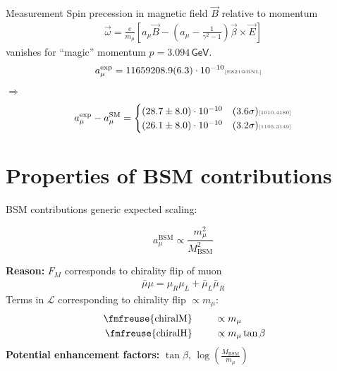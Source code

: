 \documentclass[hyperref={pdfpagelabels=false},ngerman]{beamer}
\newcommand{\fmfvcenter}[1]{\;\vcenter{\hbox{\fmfreuse{#1}}}\;}
\newcommand{\eh}[1]{\,\mathsf{#1}}
\newcommand{\mycite}[1]{\textcolor{darkgray}{\tiny [#1]}}
\renewcommand{\emph}{\textbf}
\newcommand{\SM}{\ensuremath{\text{SM}}}
\newcommand{\amu}{a_\mu}
\newcommand{\amuexp}{\amu^{\text{exp}}}
\newcommand{\amuSM}{\amu^{\SM}}
\begin{document}
\begin{frame}{Measurement}
  Spin precession in magnetic field $\vec{B}$ relative to momentum
  \begin{align*}
    \vec{\omega} = \frac{e}{m_\mu} \left[\amu\vec{B}
      - \left(\amu - \frac{1}{\gamma^2 - 1}\right)
      \vec{\beta}\times\vec{E} \right]
  \end{align*}
  vanishes for ``magic'' momentum $p=3.094\eh{GeV}$.
  \begin{align*}
    \amuexp &= 11659208.9(6.3)\cdot 10^{-10} \text{\mycite{E821@BNL}}
  \end{align*}
  $\Rightarrow$
  \begin{align*}
    \amuexp - \amuSM =
    \begin{cases}
      (28.7 \pm 8.0)\cdot 10^{-10} &(3.6\sigma) \text{\mycite{1010.4180}} \\
      (26.1 \pm 8.0)\cdot 10^{-10} &(3.2\sigma) \text{\mycite{1105.3149}}
    \end{cases}
  \end{align*}
\end{frame}

\section{Properties of BSM contributions}

\begin{frame}{BSM contributions}
  generic expected scaling:\\
  \begin{centering}
    \begin{tcolorbox}[width=0.6\textwidth,colframe={red},colback={white}]
      \begin{equation*}
        a_\mu^\text{BSM} \propto \frac{m_\mu^2}{M_\text{BSM}^2}
      \end{equation*}
    \end{tcolorbox}
  \end{centering}
  \emph{Reason:} $F_M$ corresponds to chirality flip of muon
  \begin{align*}
    \bar{\mu}\mu = \mu_R \mu_L + \bar{\mu}_L \bar{\mu}_R
  \end{align*}
  Terms in $\mathcal{L}$ corresponding to chirality flip $\propto m_\mu$:
  \begin{align*}
    \fmfvcenter{chiralM} &\qquad\propto m_\mu \\
    \fmfvcenter{chiralH} &\qquad\propto m_\mu \tan\beta
  \end{align*}
  \emph{Potential enhancement factors:}
  $\tan\beta$, $\log\left(\frac{M_\text{BSM}}{m_\mu}\right)$
\end{frame}
\end{document}
